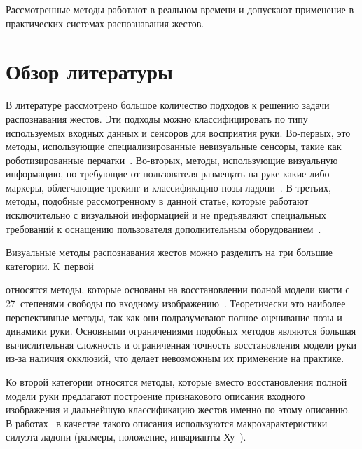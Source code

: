 \begin{multicols}{2}
Рассмотренные методы работают в реальном времени и допускают 
применение в практических системах распознавания жестов.

\vspace*{-6pt}

\section{Обзор литературы}\label{sec:RelatedWork}

В литературе рассмотрено большое количество подходов к решению задачи распознавания жестов.
Эти подходы можно классифицировать по типу используемых входных данных и сенсоров для 
восприятия руки.
Во-пер\-вых, это методы, исполь\-зу\-ющие специализированные невизуальные сенсоры, такие 
как роботизированные перчатки~\cite{GaVeDi}.
Во-вто\-рых, методы, использующие визуальную информацию, 
но требующие от пользователя размещать на руке ка\-кие-ли\-бо маркеры, облегчающие 
трекинг и классификацию позы ладони~\cite{ColorGlove2009}.
В-третьих, методы, подобные рассмотренному в данной статье, 
которые работают исключительно с визуальной информацией и
не предъявляют специальных требований к оснащению пользователя 
дополнительным оборудованием~\cite{VisionBasedReview2009}.


Визуальные методы распознавания жестов можно разделить на три большие категории.
К~первой\linebreak\vspace*{-12pt}

\pagebreak

\noindent
 относятся методы, которые основаны на вос\-ста\-нов\-ле\-нии полной модели кисти 
с 27~степенями свободы по входному изображению~\cite{ArticulatedHandTracking3d}.
Теоретически это наиболее перспективные методы, так как 
они подразумевают полное оценивание позы и динамики руки.
Основными ограничениями подобных методов являются большая вы\-чис\-ли\-тель\-ная слож\-ность 
и ограниченная точность восстановления модели руки из-за наличия окклюзий,
что делает невозможным их применение на практике.

Ко второй категории относятся методы, которые вместо восстановления полной 
модели руки предлагают построение признакового описания входного изображения 
и дальнейшую классификацию жес\-тов именно по этому описанию.
В работах~\cite{BareHand3d2006, GestureRecognitionVisapp2007} в качестве 
такого описания используются макрохарактеристики силуэта ладони (размеры, положение, 
инварианты Ху~\cite{HuInvariants}).


\end{multicols}
